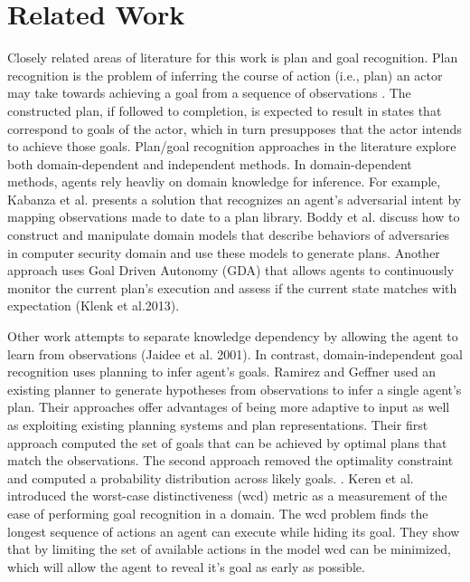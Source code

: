 \section{Related Work}
\label{sec:relatedwork}
Closely related areas of literature for this work is plan and goal recognition. Plan recognition is the problem of inferring the course of action (i.e., plan) an actor may take towards achieving a goal from a sequence of observations \cite{schmidt1978plan,kautz1986generalized}. The constructed plan, if followed to completion, is expected to result in states that correspond to goals of the actor, which in turn presupposes that the actor intends to achieve those goals. 
Plan/goal recognition approaches in the literature explore both domain-dependent and independent methods. In domain-dependent methods, agents rely heavliy on domain knowledge for inference. For example, Kabanza et al.   presents a solution that recognizes an agent’s adversarial intent by mapping observations made to date to a plan library. Boddy et al.  discuss how to construct and manipulate domain models that describe behaviors of adversaries in computer
security domain and use these models to generate plans. Another approach uses
Goal Driven Autonomy (GDA) that allows agents to continuously monitor the current plan’s execution and assess if the current state matches with expectation (Klenk et al.2013)\nocite{aha2013gda}. 

Other work attempts to separate knowledge dependency by allowing the agent to learn from observations (Jaidee et al. 2001)\nocite{jaidee2011gda}. In contrast, domain-independent goal recognition uses planning to infer agent’s goals. Ramirez and Geffner  used an existing planner to generate hypotheses from observations to infer a single agent's plan. Their approaches offer advantages of being more adaptive to input as well as exploiting existing planning systems and plan representations. Their first approach computed the set of goals that can be achieved by optimal plans that match the observations. The second approach removed the optimality constraint and computed a probability distribution across likely goals. \cite{ramirez2010probabilistic}. Keren et al.  introduced the worst-case distinctiveness (wcd) metric as a measurement of the ease of performing goal recognition in a domain. The wcd problem finds the longest sequence of actions an agent can execute while hiding its goal. They show that by limiting the set of available actions in the model wcd can be minimized, which will allow the agent to reveal it's goal as early as possible.

